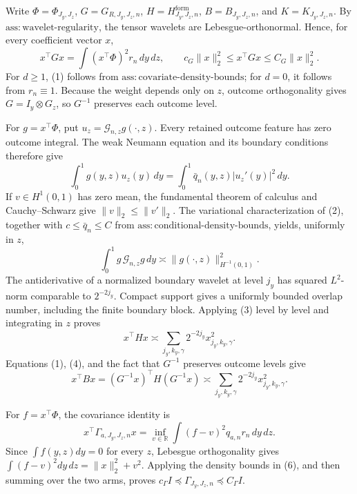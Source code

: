 Write \(\Phi=\Phi_{J_y,J_z}\), \(G=G_{R,J_y,J_z,n}\), \(H=H^{\mathrm{form}}_{J_y,J_z,n}\), \(B=B_{J_y,J_z,n}\), and \(K=K_{J_y,J_z,n}\).  By \(\mathrm{ass{:}wavelet\text{-}regularity}\), the tensor wavelets are Lebesgue-orthonormal.  Hence, for every coefficient vector \(x\),
\[
x^{\top}Gx=\int (x^{\top}\Phi)^2r_n\,dy\,dz,
\qquad c_G\|x\|_2^2\le x^{\top}Gx\le C_G\|x\|_2^2. \tag{1}
\]
For \(d\ge1\), (1) follows from \(\mathrm{ass{:}covariate\text{-}density\text{-}bounds}\); for \(d=0\), it follows from \(r_n\equiv1\).  Because the weight depends only on \(z\), outcome orthogonality gives \(G=I_y\otimes G_z\), so \(G^{-1}\) preserves each outcome level.

For \(g=x^{\top}\Phi\), put \(u_z=\mathcal G_{n,z}g(\cdot,z)\).  Every retained outcome feature has zero outcome integral.  The weak Neumann equation and its boundary conditions therefore give
\[
\int_0^1g(y,z)u_z(y)\,dy
=\int_0^1\bar q_n(y,z)|u_z'(y)|^2\,dy. \tag{2}
\]
If \(v\in H^1(0,1)\) has zero mean, the fundamental theorem of calculus and Cauchy--Schwarz give \(\|v\|_2\le\|v'\|_2\).  The variational characterization of (2), together with \(c\le\bar q_n\le C\) from \(\mathrm{ass{:}conditional\text{-}density\text{-}bounds}\), yields, uniformly in \(z\),
\[
\int_0^1g\,\mathcal G_{n,z}g\,dy
\asymp \|g(\cdot,z)\|_{H^{-1}(0,1)}^2. \tag{3}
\]
The antiderivative of a normalized boundary wavelet at level \(j_y\) has squared \(L^2\)-norm comparable to \(2^{-2j_y}\).  Compact support gives a uniformly bounded overlap number, including the finite boundary block.  Applying (3) level by level and integrating in \(z\) proves
\[
x^{\top}Hx\asymp
\sum_{j_y,k_y,\gamma}2^{-2j_y}x_{j_y,k_y,\gamma}^2. \tag{4}
\]
Equations (1), (4), and the fact that \(G^{-1}\) preserves outcome levels give
\[
x^{\top}Bx=(G^{-1}x)^{\top}H(G^{-1}x)
\asymp\sum_{j_y,k_y,\gamma}2^{-2j_y}x_{j_y,k_y,\gamma}^2. \tag{5}
\]

For \(f=x^{\top}\Phi\), the covariance identity is
\[
x^{\top}\Gamma_{a,J_y,J_z,n}x
=\inf_{v\in\mathbb R}\int(f-v)^2q_{a,n}r_n\,dy\,dz. \tag{6}
\]
Since \(\int f(y,z)dy=0\) for every \(z\), Lebesgue orthogonality gives \(\int(f-v)^2dy\,dz=\|x\|_2^2+v^2\).  Applying the density bounds in (6), and then summing over the two arms, proves \(c_\Gamma I\preceq\Gamma_{J_y,J_z,n}\preceq C_\Gamma I\).

